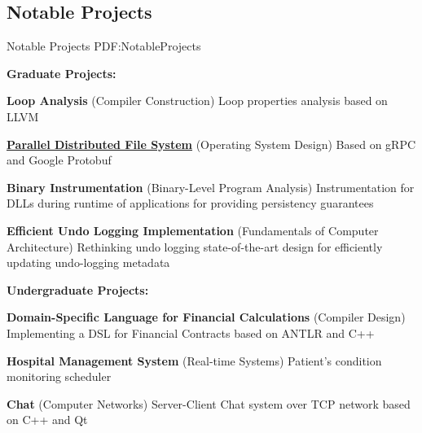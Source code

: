 \documentclass[a4paper,9pt,oneside]{article}
\begin{document}
\begin{body}




\section
{Notable Projects}
{Notable Projects}
{PDF:NotableProjects}

\textbf{Graduate Projects:}

\BulletItem
\textbf{Loop Analysis}
(Compiler Construction)
\hfill
{}
\SubBulletItem
Loop properties analysis based on LLVM

\BulletItem
\href{https://github.com/arminvakil/PFS}
{\textbf{Parallel Distributed File System}}
(Operating System Design)
\hfill
{}
\SubBulletItem
Based on gRPC and Google Protobuf

\BulletItem
\textbf{Binary Instrumentation}
(Binary-Level Program Analysis)
\hfill
{}
\SubBulletItem
Instrumentation for DLLs during runtime of applications for providing persistency guarantees

\BulletItem
{\textbf{Efficient Undo Logging Implementation}}
(Fundamentals of Computer Architecture)
\hfill
{}
\SubBulletItem
Rethinking undo logging state-of-the-art design for efficiently updating undo-logging metadata

\textbf{Undergraduate Projects:}

\BulletItem
\textbf{Domain-Specific Language for Financial Calculations} (Compiler Design)
\hfill
{}
\SubBulletItem
Implementing a DSL for Financial Contracts based on ANTLR and C++

\BulletItem
\textbf{Hospital Management System} (Real-time Systems)
\hfill
{}
\SubBulletItem
Patient's condition monitoring scheduler


\BulletItem
\textbf{Chat} (Computer Networks)
\hfill
{}
\SubBulletItem
Server-Client Chat system over TCP network based on C++ and Qt


\end{body}
\end{document}

